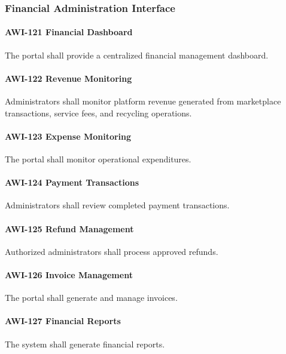 \subsubsection*{Financial Administration Interface}

\paragraph{AWI-121 Financial Dashboard}

The portal shall provide a centralized financial management dashboard.

\paragraph{AWI-122 Revenue Monitoring}

Administrators shall monitor platform revenue generated from marketplace
transactions, service fees, and recycling operations.

\paragraph{AWI-123 Expense Monitoring}

The portal shall monitor operational expenditures.

\paragraph{AWI-124 Payment Transactions}

Administrators shall review completed payment transactions.

\paragraph{AWI-125 Refund Management}

Authorized administrators shall process approved refunds.

\paragraph{AWI-126 Invoice Management}

The portal shall generate and manage invoices.

\paragraph{AWI-127 Financial Reports}

The system shall generate financial reports.

